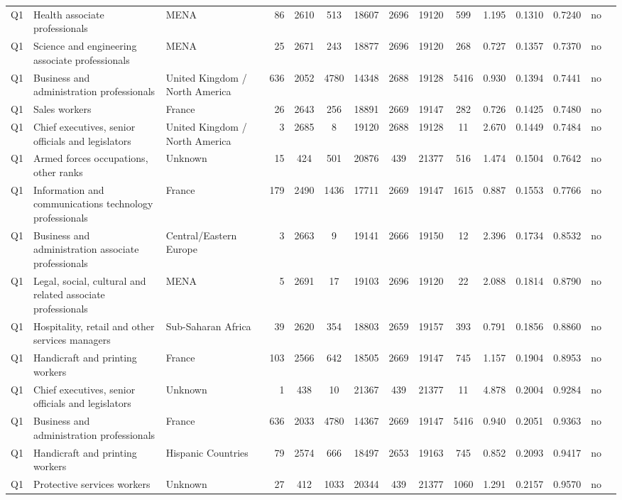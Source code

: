\begin{longtable}{lllrcccccccccll}
Q1 & Health associate professionals & MENA & 86 & 2610 & 513 & 18607 & 2696 & 19120 & 599 & 1.195 & 0.1310 & 0.7240 & no \\
Q1 & Science and engineering associate professionals & MENA & 25 & 2671 & 243 & 18877 & 2696 & 19120 & 268 & 0.727 & 0.1357 & 0.7370 & no \\
Q1 & Business and administration professionals & United Kingdom / North America & 636 & 2052 & 4780 & 14348 & 2688 & 19128 & 5416 & 0.930 & 0.1394 & 0.7441 & no \\
Q1 & Sales workers & France & 26 & 2643 & 256 & 18891 & 2669 & 19147 & 282 & 0.726 & 0.1425 & 0.7480 & no \\
Q1 & Chief executives, senior officials and legislators & United Kingdom / North America & 3 & 2685 & 8 & 19120 & 2688 & 19128 & 11 & 2.670 & 0.1449 & 0.7484 & no \\
Q1 & Armed forces occupations, other ranks & Unknown & 15 & 424 & 501 & 20876 & 439 & 21377 & 516 & 1.474 & 0.1504 & 0.7642 & no \\
Q1 & Information and communications technology professionals & France & 179 & 2490 & 1436 & 17711 & 2669 & 19147 & 1615 & 0.887 & 0.1553 & 0.7766 & no \\
Q1 & Business and administration associate professionals & Central/Eastern Europe & 3 & 2663 & 9 & 19141 & 2666 & 19150 & 12 & 2.396 & 0.1734 & 0.8532 & no \\
Q1 & Legal, social, cultural and related associate professionals & MENA & 5 & 2691 & 17 & 19103 & 2696 & 19120 & 22 & 2.088 & 0.1814 & 0.8790 & no \\
Q1 & Hospitality, retail and other services managers & Sub-Saharan Africa & 39 & 2620 & 354 & 18803 & 2659 & 19157 & 393 & 0.791 & 0.1856 & 0.8860 & no \\
Q1 & Handicraft and printing workers & France & 103 & 2566 & 642 & 18505 & 2669 & 19147 & 745 & 1.157 & 0.1904 & 0.8953 & no \\
Q1 & Chief executives, senior officials and legislators & Unknown & 1 & 438 & 10 & 21367 & 439 & 21377 & 11 & 4.878 & 0.2004 & 0.9284 & no \\
Q1 & Business and administration professionals & France & 636 & 2033 & 4780 & 14367 & 2669 & 19147 & 5416 & 0.940 & 0.2051 & 0.9363 & no \\
Q1 & Handicraft and printing workers & Hispanic Countries & 79 & 2574 & 666 & 18497 & 2653 & 19163 & 745 & 0.852 & 0.2093 & 0.9417 & no \\
Q1 & Protective services workers & Unknown & 27 & 412 & 1033 & 20344 & 439 & 21377 & 1060 & 1.291 & 0.2157 & 0.9570 & no \\

\end{longtable}
